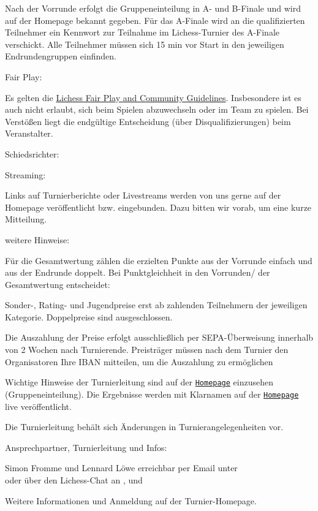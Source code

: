 \documentclass[paper=a4, fontsize=10pt]{scrartcl}
\begin{document}
\begin{basedescript}{\desclabelstyle{\multilinelabel}\desclabelwidth{10em}}
  Nach der Vorrunde erfolgt die Gruppeneinteilung in A- und B-Finale
  und wird auf der Homepage bekannt gegeben. Für das A-Finale wird an
  die qualifizierten Teilnehmer ein Kennwort zur Teilnahme im
  Lichess-Turnier des A-Finale verschickt. Alle Teilnehmer müssen sich
  15 min vor Start in den jeweiligen Endrundengruppen einfinden.

\item[Fair Play:]

  Es gelten die \href{\lichessTermsOfServiceURL}{Lichess Fair Play and
    Community Guidelines}. Insbesondere ist es auch nicht erlaubt,
  sich beim Spielen abzuwechseln oder im Team zu spielen. Bei
  Verstößen liegt die endgültige Entscheidung (über
  Disqualifizierungen) beim Veranstalter.

\item[Schiedsrichter:]

  \arbiter{}

\item[Streaming:]

  Links auf Turnierberichte oder Livestreams werden von uns gerne auf
  der Homepage veröffentlicht bzw. eingebunden. Dazu bitten wir vorab,
  um eine kurze Mitteilung.

\item[weitere Hinweise:]

  Für die Gesamtwertung zählen die erzielten Punkte aus der Vorrunde
  einfach und aus der Endrunde doppelt.  Bei Punktgleichheit in den
  Vorrunden/ der Gesamtwertung entscheidet:

  \enum{\tiebreak}

  Sonder-, Rating- und Jugendpreise erst ab
  \specialPrizesGuaranteedMinParaticipants{} zahlenden Teilnehmern der
  jeweiligen Kategorie. Doppelpreise sind ausgeschlossen.

  Die Auszahlung der Preise erfolgt ausschließlich per
  SEPA-Überweisung innerhalb von 2 Wochen nach
  Turnierende. Preisträger müssen nach dem Turnier den Organisatoren
  Ihre IBAN mitteilen, um die Auszahlung zu ermöglichen
  
  Wichtige Hinweise der Turnierleitung sind auf der
  \href{\tournamentURL}{\texttt{Homepage}} einzusehen
  (Gruppeneinteilung). Die Ergebnisse werden mit Klarnamen auf der
  \href{\tournamentURL}{\texttt{Homepage}} live veröffentlicht.

  Die Turnierleitung behält sich Änderungen in Turnierangelegenheiten
  vor.

\item[Ansprechpartner, Turnierleitung und Infos:]

  Simon Fromme und Lennard Löwe erreichbar per Email unter
  \\ \email{\tournamentEmail} oder über den Lichess-Chat an
  ,  und

  Weitere Informationen und Anmeldung auf der Turnier-Homepage.
\end{basedescript}
\end{document}
